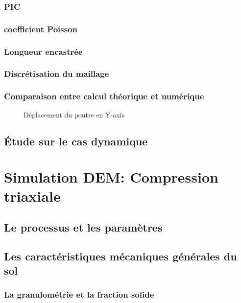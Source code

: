 \documentclass[a4paper,12pt]{report}
\begin{document}
\subsubsection{PIC}
\subsubsection{coefficient Poisson}
\subsubsection{Longueur encastrée}
\subsubsection{Discrétisation du maillage}
\subsubsection{Comparaison entre calcul théorique et numérique}
                                \begin{figure}
                                   \centering\small
                                    \caption{Déplacement du poutre en Y-axis}
                                \end{figure}
\subsection{Étude sur le cas dynamique}


\section{Simulation DEM: Compression triaxiale}
\subsection{Le processus et les paramètres}
\subsection{Les caractéristiques mécaniques générales du sol}
\subsubsection{La granulométrie et la fraction solide}
\end{document}
